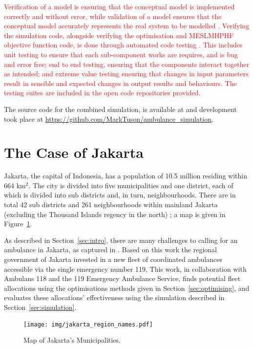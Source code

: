\documentclass[numbers,webpdf,imaman]{ima-authoring-template}%
\begin{document}
\textcolor{red}{
Verification of a model is ensuring that the conceptual model is implemented
correctly and without error, while validation of a model ensures that the
conceptual model accurately represents the real system to be modelled
\citep{robinson2014simulation}. Verifying the simulation code, alongside
verifying the optimisation and MESLMHPHF objective function code, is done
through automated code testing \citep{percival2014test, palmer2023implementing}.
This includes unit testing to ensure that each sub-component works are requires,
and is bug and error free; end to end testing, ensuring that the components
interact together as intended; and extreme value testing ensuring that changes
in input parameters result in sensible and expected changes in output results
and behaviours. The testing suites are included in the open code repositories
provided.
}

The source code for the combined simulation, is available at \citet{zenodo_sim}
and development took place at \url{https://github.com/MarkTuson/ambulance_simulation}.





\section{The Case of Jakarta}\label{sec:jakarta}
Jakarta, the capital of Indonesia, has a population of 10.5 million
\citep{BPS_Jakarta} residing within 664 km$^2$. The city is divided into five
municipalities and one district, each of which is divided into sub districts
and, in turn, neighbourhoods. There are in total 42 sub districts and 261
neighbourhoods within mainland Jakarta (excluding the Thousand Islands regency
in the north) \citep{BPS_Jakarta_angka}; a map is given in
Figure~\ref{fig:region_names}. 

As described in Section~\ref{sec:intro}, there are many challenges to calling
for an ambulance in Jakarta, as captured in \citet{BriceSyaribahNoor2022Esui}.
Based on this work the regional government of Jakarta invested in a new fleet
of coordinated ambulances accessible via the single emergency number 119.
This work, in collaboration with Ambulans 118 and the 119 Emergency Ambulance
Service, finds potential fleet allocations using the optimisations methods
given in Section~\ref{sec:optimising}, and evaluates these allocations'
effectiveness using the simulation described in Section~\ref{sec:simulation}.

\begin{figure}
\begin{center}
\texttt{[image: img/jakarta\_region\_names.pdf]}
\end{center}
\caption{Map of Jakarta's Municipalities.}
\label{fig:region_names}
\end{figure}
\end{document}
